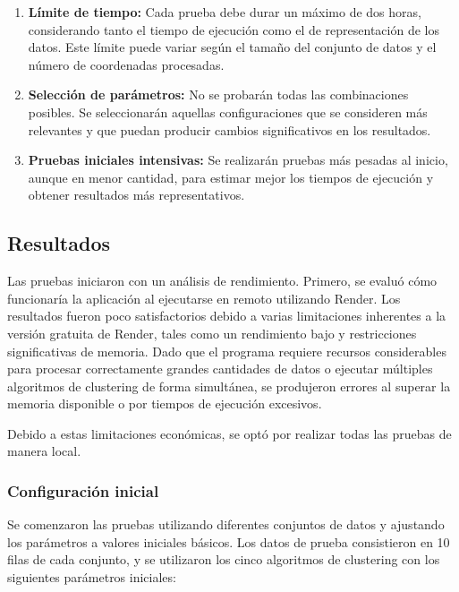 \begin{enumerate}
    \item \textbf{Límite de tiempo:} Cada prueba debe durar un máximo de dos horas, considerando tanto el tiempo de ejecución como el de representación de los datos. Este límite puede variar según el tamaño del conjunto de datos y el número de coordenadas procesadas.
    \item \textbf{Selección de parámetros:} No se probarán todas las combinaciones posibles. Se seleccionarán aquellas configuraciones que se consideren más relevantes y que puedan producir cambios significativos en los resultados.
    \item \textbf{Pruebas iniciales intensivas:} Se realizarán pruebas más pesadas al inicio, aunque en menor cantidad, para estimar mejor los tiempos de ejecución y obtener resultados más representativos.
\end{enumerate}

\subsection{Resultados}

Las pruebas iniciaron con un análisis de rendimiento. Primero, se evaluó cómo funcionaría la aplicación al ejecutarse en remoto utilizando Render. Los resultados fueron poco satisfactorios debido a varias limitaciones inherentes a la versión gratuita de Render, tales como un rendimiento bajo y restricciones significativas de memoria. Dado que el programa requiere recursos considerables para procesar correctamente grandes cantidades de datos o ejecutar múltiples algoritmos de clustering de forma simultánea, se produjeron errores al superar la memoria disponible o por tiempos de ejecución excesivos. 

Debido a estas limitaciones económicas, se optó por realizar todas las pruebas de manera local.

\subsubsection{Configuraci\'on inicial}

Se comenzaron las pruebas utilizando diferentes conjuntos de datos y ajustando los parámetros a valores iniciales básicos. Los datos de prueba consistieron en 10 filas de cada conjunto, y se utilizaron los cinco algoritmos de clustering con los siguientes parámetros iniciales:

